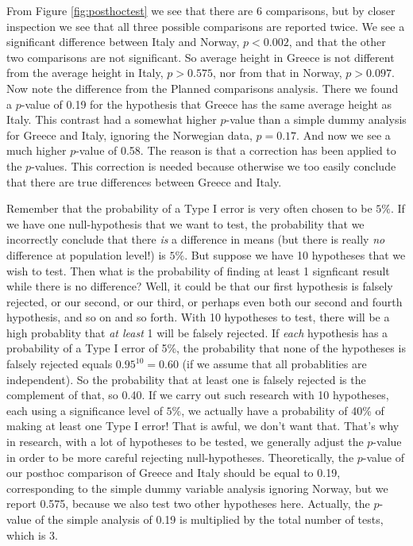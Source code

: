 \documentclass[]{book}\usepackage[]{graphicx}\usepackage[]{color}
\begin{document}
From Figure \ref{fig:posthoctest} we see that there are 6 comparisons, but by closer inspection we see that all three possible comparisons are reported twice. We see a significant difference between Italy and Norway, $p<0.002$, and that the other two comparisons are not significant. So average height in Greece is not different from the average height in Italy, $p>0.575$, nor from that in Norway, $p>0.097$.
Now note the difference from the Planned comparisons analysis. There we found a $p$-value of 0.19 for the hypothesis that Greece has the same average height as Italy. This contrast had a somewhat higher $p$-value than a simple dummy analysis for Greece and Italy, ignoring the Norwegian data, $p=0.17$. And now we see a much higher $p$-value of 0.58. The reason is that a correction has been applied to the $p$-values. This correction is needed because otherwise we too easily conclude that there are true differences between Greece and Italy.

Remember that the probability of a Type I error is very often chosen to be $5\%$. If we have one null-hypothesis that we want to test, the probability that we incorrectly conclude that there \textit{is} a difference in means (but there is really \textit{no} difference at population level!) is $5\%$. But suppose we have 10 hypotheses that we wish to test. Then what is the probability of finding at least 1 signficant result while there is no difference? Well, it could be that our first hypothesis is falsely rejected, or our second, or our third, or perhaps even both our second and fourth hypothesis, and so on and so forth. With 10 hypotheses to test, there will be a high probablity that \textit{at least} 1 will be falsely rejected. If \textit{each} hypothesis has a probability of a Type I error of 5\%, the probability that none of the hypotheses is falsely rejected equals $0.95^{10}=0.60$ (if we assume that all probablities are independent). So the probability that at least one is falsely rejected is the complement of that, so 0.40. If we carry out such research with 10 hypotheses, each using a significance level of $5\%$, we actually have a probability of 40\% of making at least one Type I error! That is awful, we don't want that. That's why in research, with a lot of hypotheses to be tested, we generally adjust the $p$-value in order to be more careful rejecting null-hypotheses. Theoretically, the $p$-value of our posthoc comparison of Greece and Italy should be equal to 0.19, corresponding to the simple dummy variable analysis ignoring Norway, but we report 0.575, because we also test two other hypotheses here. Actually, the $p$-value of the simple analysis of 0.19 is multiplied by the total number of tests, which is 3.
\end{document}
